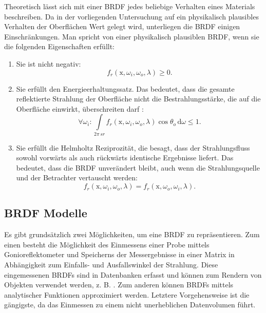 \documentclass[thesis.tex]{subfiles}
\begin{document}
Theoretisch lässt sich mit einer BRDF jedes beliebige Verhalten eines Materials beschreiben. Da in der vorliegenden Untersuchung auf ein physikalisch plausibles Verhalten der Oberflächen Wert gelegt wird, unterliegen die BRDF einigen Einschränkungen. Man spricht von einer physikalisch plausiblen BRDF, wenn sie die folgenden Eigenschaften erfüllt:
\begin{enumerate}
    \item Sie ist nicht negativ: 
    \begin{equation}
    f_r(\mathrm{x}, \omega_i, \omega_o, \lambda) \geq 0.
    \end{equation}
    \item Sie erfüllt den Energieerhaltungssatz. Das bedeutet, dass die gesamte reflektierte Strahlung der Oberfläche nicht die Bestrahlungsstärke, die auf die Oberfläche einwirkt, überschreiten darf \cite{bib:Wynn2000}:
    \begin{equation}
    \forall\omega_i : \int\limits_{2\pi\,sr} f_r(\mathrm{x}, \omega_i, \omega_o, \lambda)\cos\theta_o\, \mathrm{d}\omega \leq 1.
    \end{equation}
    \item Sie erfüllt die Helmholtz Reziprozität, die besagt, dass der Strahlungsfluss sowohl vorwärts als auch rückwärts identische Ergebnisse liefert. Das bedeutet, dass die BRDF unverändert bleibt, auch wenn die Strahlungsquelle und der Betrachter vertauscht werden: 
    \begin{equation}
    f_r(\mathrm{x}, \omega_i, \omega_o, \lambda) = f_r(\mathrm{x}, \omega_o, \omega_i, \lambda).
    \end{equation}
\end{enumerate}

\subsection{BRDF Modelle}\label{chap:brdf_models}

Es gibt grundsätzlich zwei Möglichkeiten, um eine BRDF zu repräsentieren. Zum einen besteht die Möglichkeit des Einmessens einer Probe mittels Gonioreflektometer und Speicherns der Messergebnisse in einer Matrix in Abhängigkeit zum Einfalls- und Ausfallswinkel der Strahlung. Diese eingemessenen BRDFs sind in Datenbanken erfasst und können zum Rendern von Objekten verwendet werden, z. B. \cite{bib:Matusik2003}. Zum anderen können BRDFs mittels analytischer Funktionen approximiert werden. Letztere Vorgehensweise ist die gängigste, da das Einmessen zu einem nicht unerheblichen Datenvolumen führt.
\end{document}
